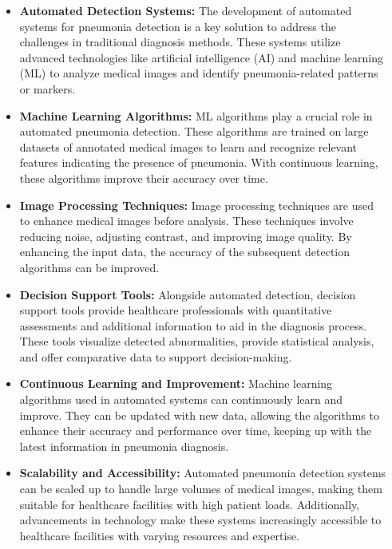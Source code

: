 \documentclass[25pt,a0paper, portrait]{tikzposter}
\begin{document}
\begin{columns}
{{\begin{itemize}
				\end{itemize}
				\bigskip
			}
		}
		
		
		{
			{
				\begin{itemize}
					\item \textbf{Automated Detection Systems:} The development of automated systems for pneumonia detection is a key solution to address the challenges in traditional diagnosis methods. These systems utilize advanced technologies like artificial intelligence (AI) and machine learning (ML) to analyze medical images and identify pneumonia-related patterns or markers. \bigskip
					
					\item \textbf{ Machine Learning Algorithms:} ML algorithms play a crucial role in automated pneumonia detection. These algorithms are trained on large datasets of annotated medical images to learn and recognize relevant features indicating the presence of pneumonia. With continuous learning, these algorithms improve their accuracy over time. \bigskip
					
					\item \textbf{ Image Processing Techniques:} Image processing techniques are used to enhance medical images before analysis. These techniques involve reducing noise, adjusting contrast, and improving image quality. By enhancing the input data, the accuracy of the subsequent detection algorithms can be improved. \bigskip
					
					\item \textbf{Decision Support Tools:} Alongside automated detection, decision support tools provide healthcare professionals with quantitative assessments and additional information to aid in the diagnosis process. These tools visualize detected abnormalities, provide statistical analysis, and offer comparative data to support decision-making. \bigskip
					
					\item \textbf{Continuous Learning and Improvement:} Machine learning algorithms used in automated systems can continuously learn and improve. They can be updated with new data, allowing the algorithms to enhance their accuracy and performance over time, keeping up with the latest information in pneumonia diagnosis.\bigskip
					
					\item \textbf{ Scalability and Accessibility:} Automated pneumonia detection systems can be scaled up to handle large volumes of medical images, making them suitable for healthcare facilities with high patient loads. Additionally, advancements in technology make these systems increasingly accessible to healthcare facilities with varying resources and expertise.\bigskip
					

\end{itemize}}}
\end{columns}
\end{document}
